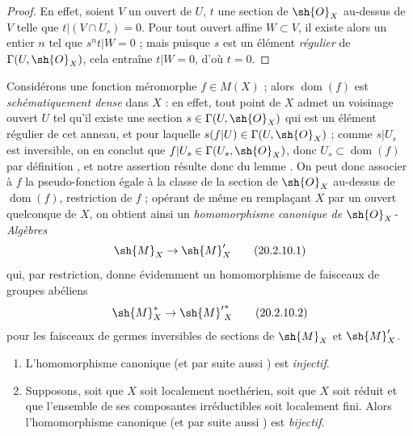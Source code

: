 \begin{proof}
En effet, soient $V$ un ouvert de $U$, $t$ une section de $\sh{O}_X$ au-dessus de $V$ telle que $t|(V\cap U_s)=0$.
Pour tout ouvert affine $W\subset V$, il existe alors un entier $n$ tel que $s^nt|W=0$  ; mais puisque $s$ est un élément \emph{régulier} de $\Gamma(U,\sh{O}_X)$, cela entraîne $t|W=0$, d'où $t=0$.
\end{proof}

\begin{env}[20.2.10]
\label{IV.20.2.10}
Considérons une fonction méromorphe $f\in M(X)$  ; alors $\operatorname{dom}(f)$ est \emph{schématiquement dense} dans $X$ : en effet, tout point de $X$ admet un voisinage ouvert $U$ tel qu'il existe une section $s\in\Gamma(U,\sh{O}_X)$ qui est un élément régulier de cet anneau, et pour laquelle $s(f|U)\in\Gamma(U,\sh{O}_X)$ ; comme $s|U_s$ est inversible, on en conclut que $f|U_s\in\Gamma(U_s,\sh{O}_X)$, donc $U_s\subset\operatorname{dom}(f)$ par définition , et notre assertion résulte donc du lemme .
On peut donc associer à $f$ la pseudo-fonction égale à la classe de la section de $\sh{O}_X$ au-dessus de $\operatorname{dom}(f)$, restriction de $f$ ; opérant de même en remplaçant $X$ par un ouvert quelconque de $X$, on obtient ainsi un \emph{homomorphisme canonique de $\sh{O}_X$-Algèbres}
\[
\label{IV.20.2.10.1}
  \sh{M}_X\to\sh{M}'_X
  \tag{20.2.10.1}
\]
qui, par restriction, donne évidemment un homomorphisme de faisceaux de groupes abéliens
\[
\label{IV.20.2.10.2}
  \sh{M}_X^*\to{\sh{M}'}^*_X
  \tag{20.2.10.2}
\]
pour les faisceaux de germes inversibles de sections de $\sh{M}_X$ et $\sh{M}'_X$.
\end{env}

\begin{proposition}[20.2.11]
\medskip
\begin{enumerate}[label=\emph{(\roman*)}]
  \item L'homomorphisme canonique \emph{} (et par suite aussi \emph{}) est \emph{injectif}.
  \item Supposons, soit que $X$ soit localement noethérien, soit que $X$ soit réduit et que l'ensemble de ses composantes irréductibles soit localement fini.
  Alors l'homomorphisme canonique \emph{} (et par suite aussi \emph{}) est \emph{bijectif}.
\end{enumerate}
\end{proposition}

